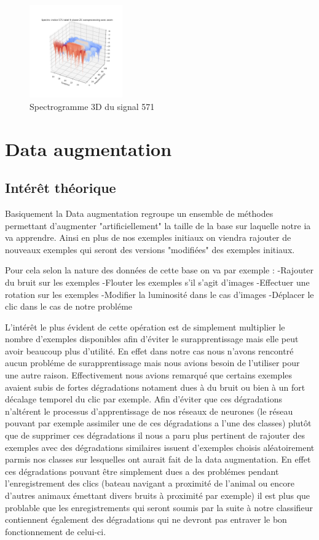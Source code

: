\begin{figure}[!h]
\centering
\includegraphics[width=4cm]{./images/indice571Spectro3Dlabel9classeZCsansprocessingaveczoom.png}
\caption{Spectrogramme 3D du signal 571}
\end{figure}

\hypertarget{Data-augmentation}{%
\section{Data augmentation}
\label{Data-augmentation}}

\hypertarget{}{%
\subsection{Intérêt théorique}
\label{}}

Basiquement la Data augmentation regroupe un ensemble de méthodes permettant d'augmenter "artificiellement" la taille de la base sur laquelle notre ia va apprendre. Ainsi en plus de nos exemples initiaux on viendra rajouter de nouveaux exemples qui seront des versions "modifiées" des exemples initiaux.

Pour cela selon la nature des données de cette base on va par exemple :
-Rajouter du bruit sur les exemples
-Flouter les exemples s'il s'agit d'images
-Effectuer une rotation sur les exemples
-Modifier la luminosité dans le cas d'images
-Déplacer le clic dans le cas de notre probléme

L'intérêt le plus évident de cette opération est de simplement multiplier le nombre d'exemples disponibles afin d'éviter le surapprentissage mais elle peut avoir beaucoup plus d'utilité. En effet dans notre cas nous n'avons rencontré aucun probléme de surapprentissage mais nous avions besoin de l'utiliser pour une autre raison.
Effectivement nous avions remarqué que certains exemples avaient subis de fortes dégradations notament dues à du bruit ou bien à un fort décalage temporel du clic par exemple. Afin d'éviter que ces dégradations n'altérent le processus d'apprentissage de nos réseaux de neurones (le réseau pouvant par exemple assimiler une de ces dégradations a l'une des classes) plutôt que de supprimer ces dégradations il nous a paru plus pertinent de rajouter des exemples avec des dégradations similaires issuent d'exemples choisis aléatoirement parmis nos classes sur lesquelles ont aurait fait de la data augmentation. En effet ces dégradations pouvant être simplement dues a des problémes pendant l'enregistrement des clics (bateau navigant a proximité de l'animal ou encore d'autres animaux émettant divers bruits à proximité par exemple) il est plus que problable que les enregistrements qui seront soumis par la suite à notre classifieur contiennent également des dégradations qui ne devront pas entraver le bon fonctionnement de celui-ci.

